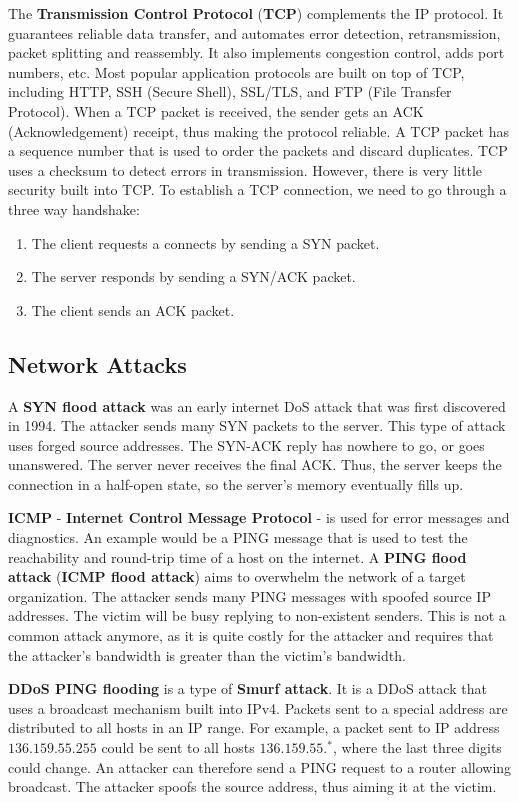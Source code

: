 \documentclass[11pt]{article}
\theoremstyle{plain} %
\theoremstyle{definition}
\theoremstyle{example}
\theoremstyle{remark}
\begin{document}
The \textbf{Transmission Control Protocol} (\textbf{TCP}) complements the IP protocol. It guarantees reliable data transfer, and automates error detection, retransmission, packet splitting and reassembly. It also implements congestion control, adds port numbers, etc. Most popular application protocols are built on top of TCP, including HTTP, SSH (Secure Shell), SSL/TLS, and FTP (File Transfer Protocol). When a TCP packet is received, the sender gets an ACK (Acknowledgement) receipt, thus making the protocol reliable. A TCP packet has a sequence number that is used to order the packets and discard duplicates. TCP uses a checksum to detect errors in transmission. However, there is very little security built into TCP. To establish a TCP connection, we need to go through a three way handshake:
\begin{enumerate}
	\item The client requests a connects by sending a SYN packet. 
	\item The server responds by sending a SYN/ACK packet.
	\item The client sends an ACK packet.
\end{enumerate}

\subsection{Network Attacks}
A \textbf{SYN flood attack} was an early internet DoS attack that was first discovered in 1994. The attacker sends many SYN packets to the server. This type of attack uses forged source addresses. The SYN-ACK reply has nowhere to go, or goes unanswered. The server never receives the final ACK. Thus, the server keeps the connection in a half-open state, so the server's memory eventually fills up.

\textbf{ICMP} - \textbf{Internet Control Message Protocol} - is used for error messages and diagnostics. An example would be a PING message that is used to test the reachability and round-trip time of a host on the internet. A \textbf{PING flood attack} (\textbf{ICMP flood attack}) aims to overwhelm the network of a target organization. The attacker sends many PING messages with spoofed source IP addresses. The victim will be busy replying to non-existent senders. This is not a common attack anymore, as it is quite costly for the attacker and requires that the attacker's bandwidth is greater than the  victim's bandwidth. 

\textbf{DDoS PING flooding} is a type of \textbf{Smurf attack}. It is a DDoS attack that uses a broadcast mechanism built into IPv4. Packets sent to a special address are distributed to all hosts in an IP range. For example, a packet sent to IP address $136.159.55.255$ could be sent to all hosts $136.159.55.^*$, where the last three digits could change. An attacker can therefore send a PING request to a router allowing broadcast. The attacker spoofs the source address, thus aiming it at the victim.
\end{document}

